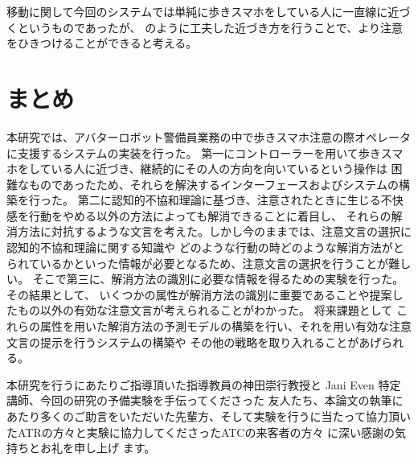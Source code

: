 \documentclass{kuisthesis}
\begin{document}
移動に関して今回のシステムでは単純に歩きスマホをしている人に一直線に近づくというものであったが、
\cite{Mizumaru2019}のように工夫した近づき方を行うことで、より注意をひきつけることができると考える。




\section{まとめ}
本研究では、アバターロボット警備員業務の中で歩きスマホ注意の際オペレータに支援するシステムの実装を行った。
第一にコントローラーを用いて歩きスマホをしている人に近づき、継続的にその人の方向を向いているという操作は
困難なものであったため、それらを解決するインターフェースおよびシステムの構築を行った。
第二に認知的不協和理論に基づき、注意されたときに生じる不快感を行動をやめる以外の方法によっても解消できることに着目し、
それらの解消方法に対抗するような文言を考えた。しかし今のままでは、注意文言の選択に認知的不協和理論に関する知識や
どのような行動の時どのような解消方法がとられているかといった情報が必要となるため、注意文言の選択を行うことが難しい。
そこで第三に、解消方法の識別に必要な情報を得るための実験を行った。その結果として、
いくつかの属性が解消方法の識別に重要であることや提案したもの以外の有効な注意文言が考えられることがわかった。
将来課題として
これらの属性を用いた解消方法の予測モデルの構築を行い、それを用い有効な注意文言の提示を行うシステムの構築や
その他の戦略を取り入れることがあげられる。

\acknowledgments %
本研究を行うにあたりご指導頂いた指導教員の神田崇行教授と Jani Even
特定講師、今回の研究の予備実験を手伝ってくださった
友人たち、本論文の執筆にあたり多くのご助言をいただいた先輩方、そして実験を行うに当たって協力頂いたATRの方々と実験に協力してくださったATCの来客者の方々
に深い感謝の気持ちとお礼を申し上げ
ます。

\nocite{*}
\end{document}
